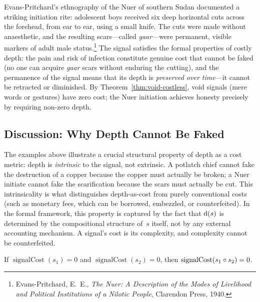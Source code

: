 \begin{example}
Evans-Pritchard's ethnography of the Nuer of southern Sudan documented a
striking initiation rite: adolescent boys received six deep horizontal
cuts across the forehead, from ear to ear, using a small knife.  The
cuts were made without anaesthetic, and the resulting scars---called
\textit{gaar}---were permanent, visible markers of adult male
status.\footnote{Evans-Pritchard, E.~E., \textit{The Nuer: A
  Description of the Modes of Livelihood and Political Institutions of
  a Nilotic People}, Clarendon Press, 1940.}  The signal satisfies the
formal properties of costly depth: the pain and risk of infection
constitute genuine cost that cannot be faked (no one can acquire
\textit{gaar} scars without enduring the cutting), and the permanence of
the signal means that its depth is \emph{preserved over time}---it
cannot be retracted or diminished.  By Theorem~\ref{thm:void-costless},
void signals (mere words or gestures) have zero cost; the Nuer
initiation achieves honesty precisely by requiring non-zero depth.
\end{example}

\subsection*{Discussion: Why Depth Cannot Be Faked}

The examples above illustrate a crucial structural property of depth as
a cost metric: depth is \emph{intrinsic} to the signal, not extrinsic.
A potlatch chief cannot fake the destruction of a copper because the
copper must actually be broken; a Nuer initiate cannot fake the
scarification because the scars must actually be cut.  This
intrinsicality is what distinguishes depth-as-cost from purely
conventional costs (such as monetary fees, which can be borrowed,
embezzled, or counterfeited).  In the formal framework, this property
is captured by the fact that $\operatorname{d}(s)$ is determined by the
compositional structure of~$s$ itself, not by any external accounting
mechanism.  A signal's cost is its complexity, and complexity cannot be
counterfeited.

\begin{theorem}
\label{thm:trivial-compose-costless}
If $\operatorname{signalCost}(s_1) = 0$ and
$\operatorname{signalCost}(s_2) = 0$, then
$\operatorname{signalCost}(s_1 \circ s_2) = 0$.
\end{theorem}


